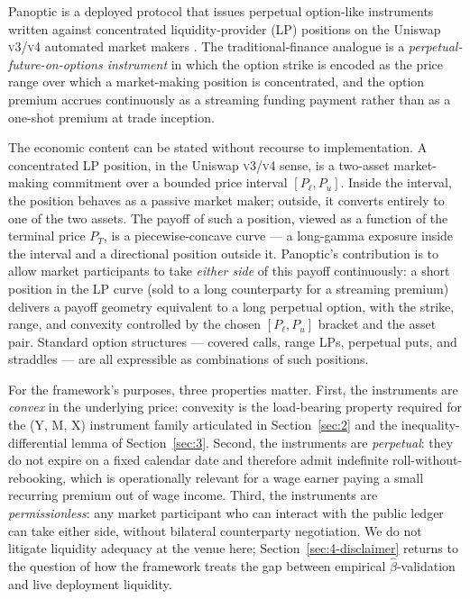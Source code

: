 Panoptic is a deployed protocol that issues perpetual option-like instruments
written against concentrated liquidity-provider (LP) positions on the Uniswap
\textsc{v3}/\textsc{v4} automated market makers
\citep{panoptic_whitepaper_2023,panoptic_docs_2026,uniswap_v3_whitepaper_2021,uniswap_v4_whitepaper_2024}.
The traditional-finance analogue is a \emph{perpetual-future-on-options
instrument} in which the option strike is encoded as the price range over
which a market-making position is concentrated, and the option premium accrues
continuously as a streaming funding payment rather than as a one-shot premium
at trade inception.

The economic content can be stated without recourse to implementation. A
concentrated LP position, in the Uniswap \textsc{v3}/\textsc{v4} sense, is a
two-asset market-making commitment over a bounded price interval
\([P_{\ell}, P_{u}]\). Inside the interval, the position behaves as a passive
market maker; outside, it converts entirely to one of the two assets. The
payoff of such a position, viewed as a function of the terminal price \(P_T\),
is a piecewise-concave curve --- a long-gamma exposure inside the interval and
a directional position outside it. Panoptic's contribution is to allow market
participants to take \emph{either side} of this payoff continuously: a short
position in the LP curve (sold to a long counterparty for a streaming premium)
delivers a payoff geometry equivalent to a long perpetual option, with the
strike, range, and convexity controlled by the chosen \([P_{\ell}, P_{u}]\)
bracket and the asset pair. Standard option structures --- covered calls,
range LPs, perpetual puts, and straddles --- are all expressible as
combinations of such positions.

For the framework's purposes, three properties matter. First, the instruments
are \emph{convex} in the underlying price: convexity is the load-bearing
property required for the (Y, M, X) instrument family articulated in
Section~\ref{sec:2} and the inequality-differential lemma of
Section~\ref{sec:3}. Second, the instruments are \emph{perpetual}: they do
not expire on a fixed calendar date and therefore admit indefinite
roll-without-rebooking, which is operationally relevant for a wage earner
paying a small recurring premium out of wage income. Third, the instruments
are \emph{permissionless}: any market participant who can interact with the
public ledger can take either side, without bilateral counterparty
negotiation. We do not litigate liquidity adequacy at the venue here;
Section~\ref{sec:4-disclaimer} returns to the question of how the framework
treats the gap between empirical \(\hat{\beta}\)-validation and live deployment
liquidity.

